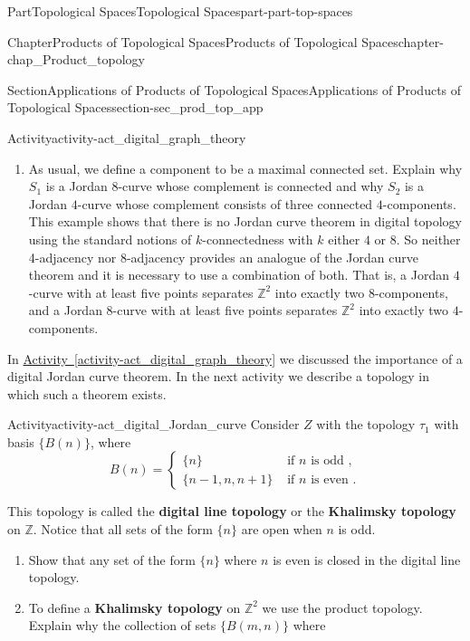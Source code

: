 \documentclass[oneside,10pt,]{book}
\newcommand{\xreffont}{\relax}
\newcommand{\terminology}[1]{\textbf{#1}}
\numberwithin{equation}{chapter}
\newcommand{\Z}{\mathbb{Z}}
\newcommand{\amp}{&}
\begin{document}
\begin{partptx}{Part}{Topological Spaces}{}{Topological Spaces}{}{}{part-part-top-spaces}
\begin{chapterptx}{Chapter}{Products of Topological Spaces}{}{Products of Topological Spaces}{}{}{chapter-chap_Product_topology}
\begin{sectionptx}{Section}{Applications of Products of Topological Spaces}{}{Applications of Products of Topological Spaces}{}{}{section-sec_prod_top_app}
\begin{activity}{Activity}{}{activity-act_digital_graph_theory}
\begin{enumerate}[font=\bfseries,label=(\alph*),ref=\alph*]
\item{}As usual, we define a component to be a maximal connected set. Explain why \(S_1\) is a Jordan \(8\)-curve whose complement is connected and why \(S_2\) is a Jordan \(4\)-curve whose complement consists of three connected \(4\)-components. This example shows that there is no Jordan curve theorem in digital topology using the standard notions of \(k\)-connectedness with \(k\) either \(4\) or \(8\). So neither 4-adjacency nor 8-adjacency provides an analogue of the Jordan curve theorem and it is necessary to use a combination of both. That is, a Jordan \(4\)-curve with at least five points separates \(\Z^2\) into exactly two \(8\)-components, and a Jordan \(8\)-curve with at least five points separates \(\Z^2\) into exactly two \(4\)-components.%
\end{enumerate}%
\end{activity}%
In \hyperref[activity-act_digital_graph_theory]{Activity~{\xreffont\ref{activity-act_digital_graph_theory}}} we discussed the importance of a digital Jordan curve theorem. In the next activity we describe a topology in which such a theorem exists.%
\begin{activity}{Activity}{}{activity-act_digital_Jordan_curve}%
%
Consider \(Z\) with the topology \(\tau_1\) with basis \(\{B(n)\}\), where%
\begin{equation*}
B(n) = \begin{cases}\{n\}  \amp \text{ if \(n\) is odd } , \\ \{n-1,n,n+1\}  \amp \text{ if \(n\) is even } . \end{cases}
\end{equation*}
%
\par
This topology is called the \terminology{digital line topology} or the \terminology{Khalimsky topology} on \(\Z\). Notice that all sets of the form \(\{n\}\) are open when \(n\) is odd.%
\begin{enumerate}[font=\bfseries,label=(\alph*),ref=\alph*]%
\item{}Show that any set of the form \(\{n\}\) where \(n\) is even is closed in the digital line topology.%
\item{}To define a \terminology{Khalimsky topology} on \(\Z^2\) we use the product topology. Explain why the collection of sets \(\{B(m,n)\}\) where%
\begin{equation*}

\end{equation*}
\end{enumerate}
\end{activity}
\end{sectionptx}
\end{chapterptx}
\end{partptx}
\end{document}
